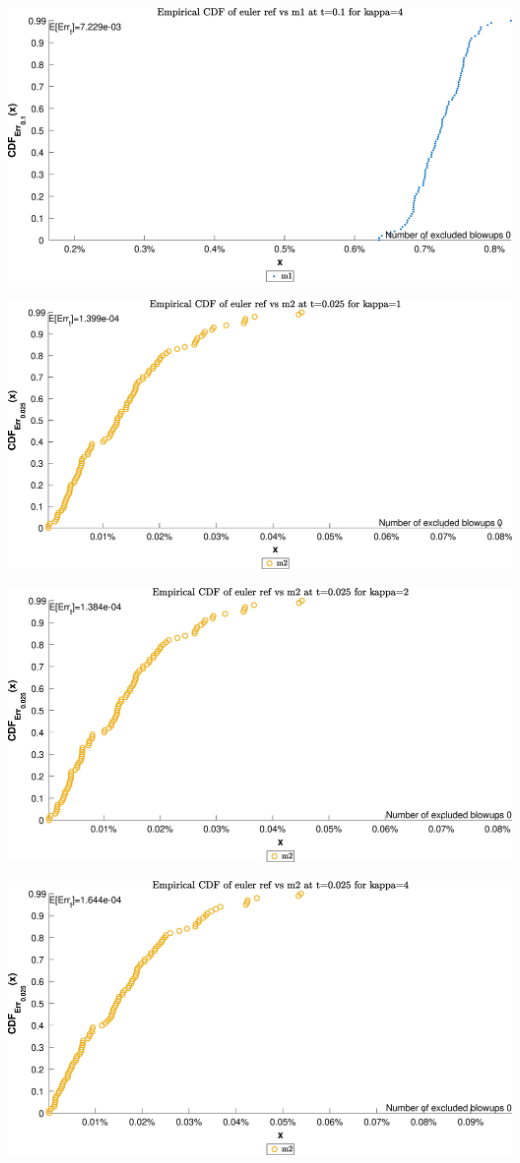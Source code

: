 \begin{landscape}
\includegraphics[width=.95\columnwidth]{CDF/CDFEulerRef_18}
\end{landscape}
\begin{landscape}
\includegraphics[width=.95\columnwidth]{CDF/CDFEulerRef_19}
\end{landscape}
\begin{landscape}
\includegraphics[width=.95\columnwidth]{CDF/CDFEulerRef_20}
\end{landscape}
\begin{landscape}
\includegraphics[width=.95\columnwidth]{CDF/CDFEulerRef_21}
\end{landscape}
